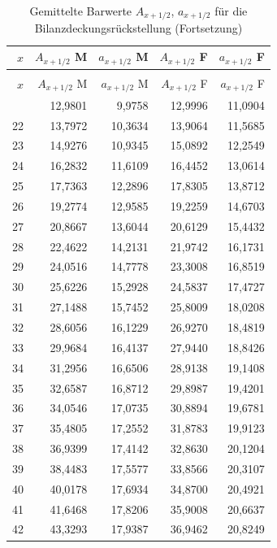 \begin{small}
\begin{longtable}{rrrrr}
\caption{Gemittelte Barwerte $A_{x+1/2}$, $a_{x+1/2}$ für die Bilanzdeckungsrückstellung}\label{tab:barwertehalb}\\
\toprule
$x$ & $A_{x+1/2}$ M & $a_{x+1/2}$ M & $A_{x+1/2}$ F & $a_{x+1/2}$ F \\
\midrule
\endfirsthead
\caption[]{Gemittelte Barwerte $A_{x+1/2}$, $a_{x+1/2}$ für die Bilanzdeckungsrückstellung (Fortsetzung)}\\
\toprule
$x$ & $A_{x+1/2}$ M & $a_{x+1/2}$ M & $A_{x+1/2}$ F & $a_{x+1/2}$ F \\
\midrule
\endhead
\bottomrule
\endfoot
21 & 12,9801 & 9,9758 & 12,9996 & 11,0904 \\
22 & 13,7972 & 10,3634 & 13,9064 & 11,5685 \\
23 & 14,9276 & 10,9345 & 15,0892 & 12,2549 \\
24 & 16,2832 & 11,6109 & 16,4452 & 13,0614 \\
25 & 17,7363 & 12,2896 & 17,8305 & 13,8712 \\
26 & 19,2774 & 12,9585 & 19,2259 & 14,6703 \\
27 & 20,8667 & 13,6044 & 20,6129 & 15,4432 \\
28 & 22,4622 & 14,2131 & 21,9742 & 16,1731 \\
29 & 24,0516 & 14,7778 & 23,3008 & 16,8519 \\
30 & 25,6226 & 15,2928 & 24,5837 & 17,4727 \\
31 & 27,1488 & 15,7452 & 25,8009 & 18,0208 \\
32 & 28,6056 & 16,1229 & 26,9270 & 18,4819 \\
33 & 29,9684 & 16,4137 & 27,9440 & 18,8426 \\
34 & 31,2956 & 16,6506 & 28,9138 & 19,1408 \\
35 & 32,6587 & 16,8712 & 29,8987 & 19,4201 \\
36 & 34,0546 & 17,0735 & 30,8894 & 19,6781 \\
37 & 35,4805 & 17,2552 & 31,8783 & 19,9123 \\
38 & 36,9399 & 17,4142 & 32,8630 & 20,1204 \\
39 & 38,4483 & 17,5577 & 33,8566 & 20,3107 \\
40 & 40,0178 & 17,6934 & 34,8700 & 20,4921 \\
41 & 41,6468 & 17,8206 & 35,9008 & 20,6637 \\
42 & 43,3293 & 17,9387 & 36,9462 & 20,8249 \\

\end{longtable}
\end{small}
